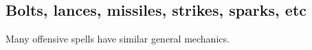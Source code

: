 %
%
%
%
%
%








\subsection*{Bolts, lances, missiles, strikes, sparks, etc}
Many offensive spells have similar general mechanics. 

